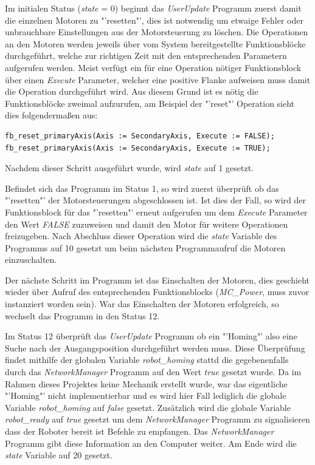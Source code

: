 Im initialen Status (\textit{state} = 0) beginnt das \textit{UserUpdate} Programm zuerst damit die einzelnen Motoren zu "'resetten"', dies ist notwendig um etwaige Fehler oder unbrauchbare Einstellungen aus der Motorsteuerung zu löschen. Die Operationen an den Motoren werden jeweils über vom System bereitgestellte Funktionsblöcke durchgeführt, welche zur richtigen Zeit mit den entsprechenden Parametern aufgerufen werden. Meist verfügt ein für eine Operation nötiger Funktionsblock über einen \textit{Execute} Parameter, welcher eine positive Flanke aufweisen muss damit die Operation durchgeführt wird. 
\newpage
Aus diesem Grund ist es nötig die Funktionsblöcke zweimal aufzurufen, am Beispiel der "'reset"' Operation sieht dies folgendermaßen aus:
\begin{lstlisting}[language = codesysls, captionpos=b, caption={Resetten einer Motors}]
fb_reset_primaryAxis(Axis := SecondaryAxis, Execute := FALSE);
fb_reset_primaryAxis(Axis := SecondaryAxis, Execute := TRUE);
\end{lstlisting}

Nachdem dieser Schritt ausgeführt wurde, wird \textit{state} auf 1 gesetzt. 

Befindet sich das Programm im Status 1, so wird zuerst überprüft ob das "'resetten"' der Motorsteuerungen abgeschlossen ist. Ist dies der Fall, so wird der Funktionsblock für das "'resetten"' erneut aufgerufen um dem \textit{Execute} Parameter den Wert \textit{FALSE} zuzuweisen und damit den Motor für weitere Operationen freizugeben.
Nach Abschluss dieser Operation wird die \textit{state} Variable des Programms auf 10 gesetzt um beim nächsten Programmaufruf die Motoren einzuschalten.

Der nächste Schritt im Programm ist das Einschalten der Motoren, dies geschieht wieder über Aufruf des entsprechenden Funktionsblocks (\textit{MC\_Power}, muss zuvor instanziert worden sein). War das Einschalten der Motoren erfolgreich, so wechselt das Programm in den Status 12.

Im Status 12 überprüft das \textit{UserUpdate} Programm ob ein "'Homing"' also eine Suche nach der Ausgangsposition durchgeführt werden muss. Diese Überprüfung findet mithilfe der globalen Variable \textit{robot\_homing} stattd die gegebenenfalls durch das \textit{NetworkManager} Programm auf den Wert \textit{true} gesetzt wurde.
Da im Rahmen dieses Projektes keine Mechanik erstellt wurde, war das eigentliche "'Homing"' nicht implementierbar und es wird hier Fall lediglich die globale Variable \textit{robot\_homing} auf \textit{false} gesetzt. Zusätzlich wird die globale Variable \textit{robot\_ready} auf \textit{true} gesetzt um dem \textit{NetworkManager} Programm zu signalisieren dass der Roboter bereit ist Befehle zu empfangen. Das \textit{NetworkManager} Programm gibt diese Information an den Computer weiter. Am Ende wird die \textit{state} Variable auf 20 gesetzt.


